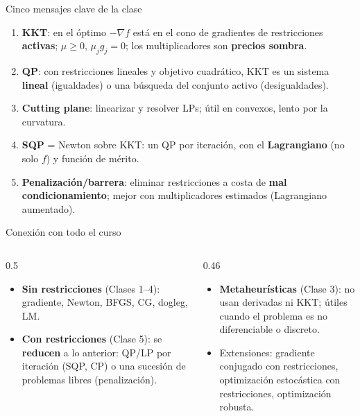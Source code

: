 \documentclass[aspectratio=169]{beamer}
\newcommand{\grad}{\nabla}
\begin{document}
\begin{frame}{Cinco mensajes clave de la clase}
  \begin{enumerate}
    \item \textbf{KKT}: en el óptimo $-\grad f$ está en el cono de gradientes de restricciones \textbf{activas}; $\mu\ge0$, $\mu_jg_j=0$; los multiplicadores son \textbf{precios sombra}.
    \item \textbf{QP}: con restricciones lineales y objetivo cuadrático, KKT es un sistema \textbf{lineal} (igualdades) o una búsqueda del conjunto activo (desigualdades).
    \item \textbf{Cutting plane}: linearizar y resolver LPs; útil en convexos, lento por la curvatura.
    \item \textbf{SQP} = Newton sobre KKT: un QP por iteración, con el \textbf{Lagrangiano} (no solo $f$) y función de mérito.
    \item \textbf{Penalización/barrera}: eliminar restricciones a costa de \textbf{mal condicionamiento}; mejor con multiplicadores estimados (Lagrangiano aumentado).
  \end{enumerate}
\end{frame}

\begin{frame}{Conexión con todo el curso}
  \begin{columns}[T]
    \begin{column}{0.5\textwidth}
      \begin{itemize}
        \item \textbf{Sin restricciones} (Clases 1--4): gradiente, Newton, BFGS, CG, dogleg, LM.
        \item \textbf{Con restricciones} (Clase 5): se \textbf{reducen} a lo anterior: QP/LP por iteración (SQP, CP) o una sucesión de problemas libres (penalización).
      \end{itemize}
    \end{column}
    \begin{column}{0.46\textwidth}
      \begin{itemize}
        \item \textbf{Metaheurísticas} (Clase 3): no usan derivadas ni KKT; útiles cuando el problema es no diferenciable o discreto.
        \item Extensiones: gradiente conjugado con restricciones, optimización estocástica con restricciones, optimización robusta.
      \end{itemize}
    \end{column}
  \end{columns}
\end{frame}
\end{document}
